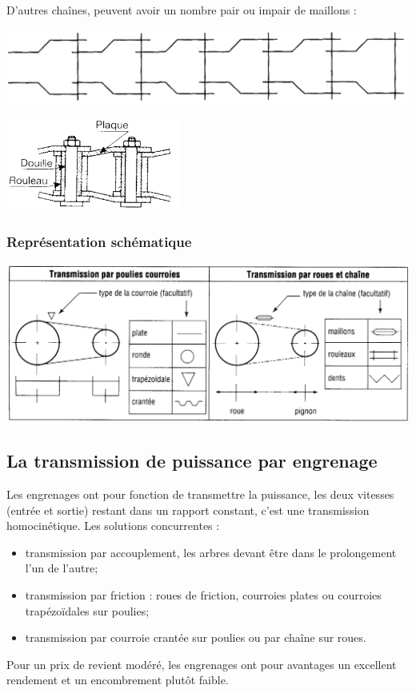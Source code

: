 \documentclass[11pt,oneside]{article}
\begin{document}
D’autres chaînes, peuvent avoir un nombre pair ou impair de maillons :
\begin{minipage}[c]{.45\linewidth}
\begin{center}
\includegraphics[height=2.5cm]{png/fig_54}
\end{center}
\end{minipage} \hfill
\begin{minipage}[c]{.45\linewidth}
\begin{center}
\includegraphics[height=3cm]{png/fig_55}
\end{center}
\end{minipage} 

\subsubsection{Représentation schématique}

\begin{center}
\includegraphics[width=.75\textwidth]{png/fig_56}
\end{center}


\subsection{La transmission de puissance par engrenage}
Les engrenages ont pour fonction de transmettre la puissance, les deux vitesses (entrée et sortie) restant dans un rapport constant, c’est une transmission homocinétique.
Les solutions concurrentes :
\begin{itemize}
\item transmission par accouplement, les arbres devant être dans le prolongement l’un de l’autre;
\item transmission par friction : roues de friction, courroies plates ou courroies trapézoïdales sur poulies;
\item transmission par courroie crantée sur poulies ou par chaîne sur roues.
\end{itemize}
Pour un prix de revient modéré, les engrenages ont pour avantages un excellent rendement et un encombrement plutôt faible.
\end{document}
